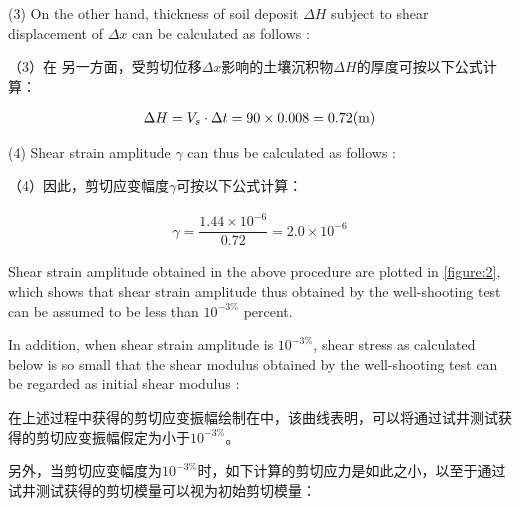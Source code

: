 \begin{paracol}{2}    

    (3) On the other hand, thickness of soil deposit $\Delta{}H$ subject to shear displacement of $\Delta{}x$ can be calculated as follows :

    \switchcolumn
    
    （3）在 另一方面，受剪切位移$\Delta{}x$影响的土壤沉积物$\Delta{}H$的厚度可按以下公式计算：

\end{paracol}

\begin{align}
    \Delta{}H=V_s\cdot{}\Delta{}t=90\times{}0.008=0.72(\rm{m})
    \label{equation:3}
\end{align}

\begin{paracol}{2}

    (4) Shear strain amplitude $\gamma$ can thus be calculated as follows :

    \switchcolumn
    
    （4）因此，剪切应变幅度$\gamma$可按以下公式计算：

\end{paracol}

\begin{align}
    \gamma=\dfrac{1.44\times{}10^{-6}}{0.72}=2.0\times{}10^{-6}
    \label{equation:4}
\end{align}

\begin{paracol}{2}

    Shear strain amplitude obtained in the above procedure are plotted in \autoref{figure:2}, which shows that shear strain amplitude thus obtained by the well-shooting test can be assumed to be less than $10^{-3\%}$ percent.
    
    In addition, when shear strain amplitude is $10^{-3\%}$, shear stress as calculated below is so small that the shear modulus obtained by the well-shooting test can be regarded as initial shear modulus :

    \switchcolumn

    在上述过程中获得的剪切应变振幅绘制在中，该曲线表明，可以将通过试井测试获得的剪切应变振幅假定为小于$10^{-3\%}$。
    
    另外，当剪切应变幅度为$10^{-3\%}$时，如下计算的剪切应力是如此之小，以至于通过试井测试获得的剪切模量可以视为初始剪切模量：

\end{paracol}

